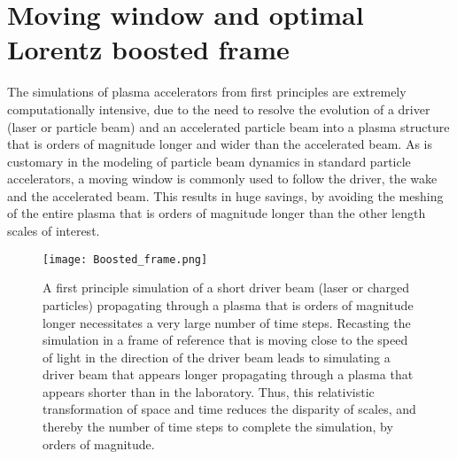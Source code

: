 

\section{Moving window and optimal Lorentz boosted frame}

The simulations of plasma accelerators from first principles are extremely computationally intensive, due to the need to resolve the evolution of a driver (laser or particle beam) and an accelerated particle beam into a plasma structure that is orders of magnitude longer and wider than the accelerated beam. As is customary in the modeling of particle beam dynamics in standard particle accelerators, a moving window is commonly used to follow the driver, the wake and the accelerated beam. This results in huge savings, by avoiding the meshing of the entire plasma that is orders of magnitude longer than the other length scales of interest.

\begin{figure}
\texttt{[image: Boosted\_frame.png]}
\caption{\label{fig:PIC} A first principle simulation of a short driver beam (laser or charged particles) propagating through a plasma that is orders of magnitude longer necessitates a very large number of time steps. Recasting the simulation in a frame of reference that is moving close to the speed of light in the direction of the driver beam leads to simulating a driver beam that appears longer propagating through a plasma that appears shorter than in the laboratory. Thus, this relativistic transformation of space and time reduces the disparity of scales, and thereby the number of time steps to complete the simulation, by orders of magnitude.}
\end{figure}

